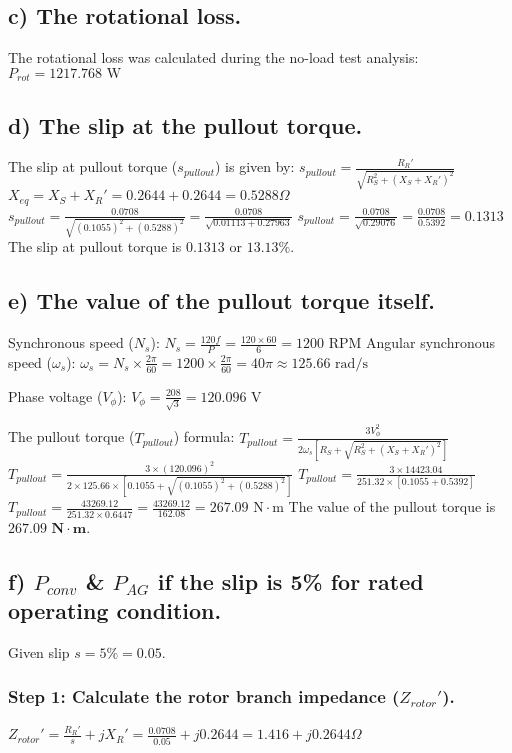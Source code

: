 \documentclass{article}
\begin{document}
	\subsection*{c) The rotational loss.}
	The rotational loss was calculated during the no-load test analysis:
	$P_{rot} = 1217.768 \text{ W}$
	
	\subsection*{d) The slip at the pullout torque.}
	The slip at pullout torque ($s_{pullout}$) is given by:
	$s_{pullout} = \frac{R_R'}{\sqrt{R_S^2 + (X_S + X_R')^2}}$
	$X_{eq} = X_S + X_R' = 0.2644 + 0.2644 = 0.5288 \Omega$
	$s_{pullout} = \frac{0.0708}{\sqrt{(0.1055)^2 + (0.5288)^2}} = \frac{0.0708}{\sqrt{0.01113 + 0.27963}}$
	$s_{pullout} = \frac{0.0708}{\sqrt{0.29076}} = \frac{0.0708}{0.5392} = 0.1313$
	The slip at pullout torque is $\mathbf{0.1313}$ or $\mathbf{13.13\%}$.
	
	\subsection*{e) The value of the pullout torque itself.}
	Synchronous speed ($N_s$):
	$N_s = \frac{120f}{P} = \frac{120 \times 60}{6} = 1200 \text{ RPM}$
	Angular synchronous speed ($\omega_s$):
	$\omega_s = N_s \times \frac{2\pi}{60} = 1200 \times \frac{2\pi}{60} = 40\pi \approx 125.66 \text{ rad/s}$
	
	Phase voltage ($V_{\phi}$):
	$V_{\phi} = \frac{208}{\sqrt{3}} = 120.096 \text{ V}$
	
	The pullout torque ($T_{pullout}$) formula:
	$T_{pullout} = \frac{3 V_{\phi}^2}{2 \omega_s [R_S + \sqrt{R_S^2 + (X_S + X_R')^2}]}$
	$T_{pullout} = \frac{3 \times (120.096)^2}{2 \times 125.66 \times [0.1055 + \sqrt{(0.1055)^2 + (0.5288)^2}]}$
	$T_{pullout} = \frac{3 \times 14423.04}{251.32 \times [0.1055 + 0.5392]}$
	$T_{pullout} = \frac{43269.12}{251.32 \times 0.6447} = \frac{43269.12}{162.08} = 267.09 \text{ N}\cdot\text{m}$
	The value of the pullout torque is $\mathbf{267.09 \text{ N}\cdot\text{m}}$.
	
	\subsection*{f) $P_{conv}$ \& $P_{AG}$ if the slip is 5\% for rated operating condition.}
	Given slip $s = 5\% = 0.05$.
	
	\subsubsection*{Step 1: Calculate the rotor branch impedance ($Z_{rotor}'$).}
	$Z_{rotor}' = \frac{R_R'}{s} + jX_R' = \frac{0.0708}{0.05} + j0.2644 = 1.416 + j0.2644 \Omega$
	
\end{document}
